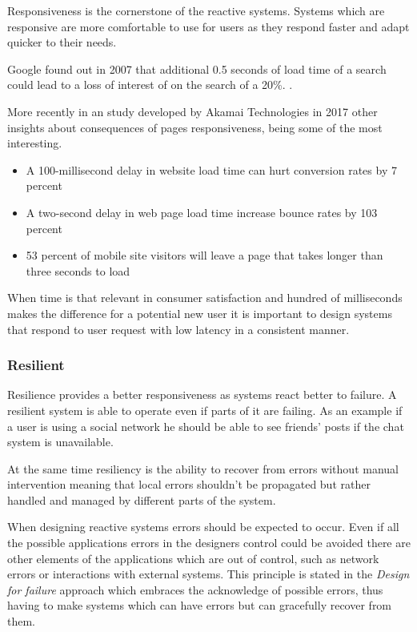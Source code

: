 \documentclass[../main.tex]{subfiles}
\begin{document}
Responsiveness is the cornerstone of the reactive
systems. Systems which are responsive are more comfortable to use for users as
they respond faster and adapt quicker to their needs.

Google found out in 2007 that additional 0.5 seconds of load time of a search
could lead to a loss of interest of on the search of a 20\%. \autocite{MayerGoogleYouTube}.

More recently in an study developed by Akamai Technologies in 2017 \autocite{Akamai2017TheAkamai} other
insights about consequences of pages responsiveness, being some of the most
interesting.

\begin{itemize}
    \item A 100-millisecond delay in website load time can hurt conversion rates
by 7 percent

    \item A two-second delay in web page load time increase bounce rates by 103
percent

    \item 53 percent of mobile site visitors will leave a page that takes longer
than three seconds to load
\end{itemize}

When time is that relevant in consumer satisfaction and hundred of milliseconds
makes the difference for a potential new user it is important to design systems
that respond to user request with low latency in a consistent manner.

\subsubsection{Resilient}

Resilience provides a better responsiveness as systems
react better to failure. A resilient system is able to operate even if parts of
it are failing. As an example if a user is using a social network he should be
able to see friends' posts if the chat system is unavailable.

At the same time resiliency is the ability to recover from errors without manual
intervention meaning that local errors shouldn't be propagated but rather handled and
managed by different parts of the system.

When designing reactive systems errors should be expected to occur. Even if all
the possible applications errors in the designers control could be avoided there
are other elements of the applications which are out of control, such as network
errors or interactions with external systems. This principle is stated in the
\textit{Design for failure} approach \autocite{Sussna2015DesigningDelivery} which embraces the
acknowledge of possible errors, thus having to make systems which can have
errors but can gracefully recover from them.
\end{document}
